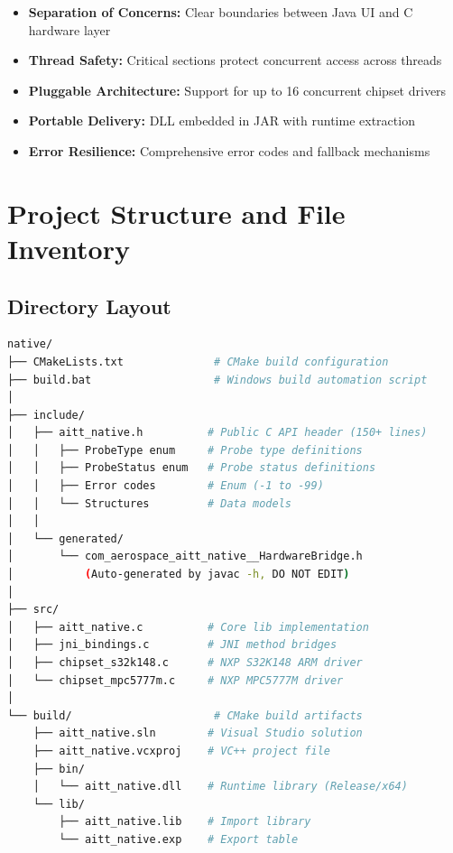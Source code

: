 \documentclass[12pt,a4paper]{article}
\begin{document}
\begin{itemize}
    \item \textbf{Separation of Concerns:} Clear boundaries between Java UI and C hardware layer
    \item \textbf{Thread Safety:} Critical sections protect concurrent access across threads
    \item \textbf{Pluggable Architecture:} Support for up to 16 concurrent chipset drivers
    \item \textbf{Portable Delivery:} DLL embedded in JAR with runtime extraction
    \item \textbf{Error Resilience:} Comprehensive error codes and fallback mechanisms
\end{itemize}

\newpage

\section{Project Structure and File Inventory}

\subsection{Directory Layout}

\begin{lstlisting}[language=bash, caption=Native Module Directory Structure]
native/
├── CMakeLists.txt              # CMake build configuration
├── build.bat                   # Windows build automation script
│
├── include/
│   ├── aitt_native.h          # Public C API header (150+ lines)
│   │   ├── ProbeType enum     # Probe type definitions
│   │   ├── ProbeStatus enum   # Probe status definitions
│   │   ├── Error codes        # Enum (-1 to -99)
│   │   └── Structures         # Data models
│   │
│   └── generated/
│       └── com_aerospace_aitt_native__HardwareBridge.h
│           (Auto-generated by javac -h, DO NOT EDIT)
│
├── src/
│   ├── aitt_native.c          # Core lib implementation
│   ├── jni_bindings.c         # JNI method bridges
│   ├── chipset_s32k148.c      # NXP S32K148 ARM driver
│   └── chipset_mpc5777m.c     # NXP MPC5777M driver
│
└── build/                      # CMake build artifacts
    ├── aitt_native.sln        # Visual Studio solution
    ├── aitt_native.vcxproj    # VC++ project file
    ├── bin/
    │   └── aitt_native.dll    # Runtime library (Release/x64)
    └── lib/
        ├── aitt_native.lib    # Import library
        └── aitt_native.exp    # Export table
\end{lstlisting}
\end{document}
